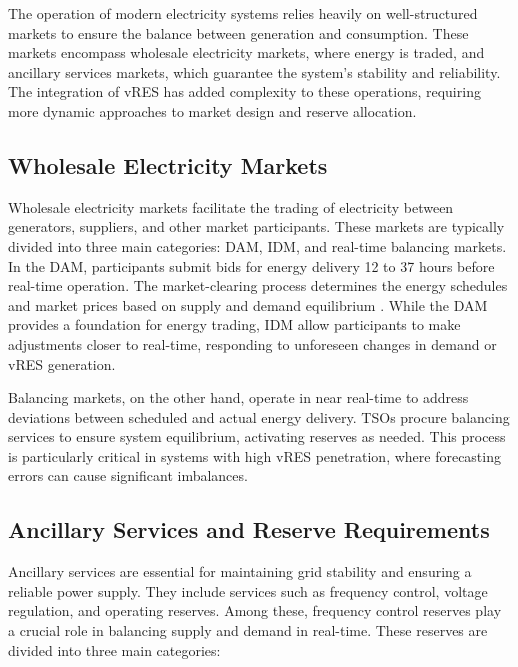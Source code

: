 The operation of modern electricity systems relies heavily on well-structured markets to ensure the balance between generation and consumption. These markets encompass wholesale electricity markets, where energy is traded, and ancillary services markets, which guarantee the system's stability and reliability. The integration of \gls{vRES} has added complexity to these operations, requiring more dynamic approaches to market design and reserve allocation.\par

\subsection{Wholesale Electricity Markets}

Wholesale electricity markets facilitate the trading of electricity between generators, suppliers, and other market participants. These markets are typically divided into three main categories: \gls{DAM}, \gls{IDM}, and real-time balancing markets. In the \gls{DAM}, participants submit bids for energy delivery 12 to 37 hours before real-time operation. The market-clearing process determines the energy schedules and market prices based on supply and demand equilibrium \cite{dgegmss}. While the \gls{DAM} provides a foundation for energy trading, \gls{IDM} allow participants to make adjustments closer to real-time, responding to unforeseen changes in demand or \gls{vRES} generation.\par

Balancing markets, on the other hand, operate in near real-time to address deviations between scheduled and actual energy delivery. \gls{TSO}s procure balancing services to ensure system equilibrium, activating reserves as needed. This process is particularly critical in systems with high \gls{vRES} penetration, where forecasting errors can cause significant imbalances.\cite{Rassid2017} \cite{Carneiro2016}\par

\subsection{Ancillary Services and Reserve Requirements}

Ancillary services are essential for maintaining grid stability and ensuring a reliable power supply. They include services such as frequency control, voltage regulation, and operating reserves. Among these, frequency control reserves play a crucial role in balancing supply and demand in real-time. These reserves are divided into three main categories:


